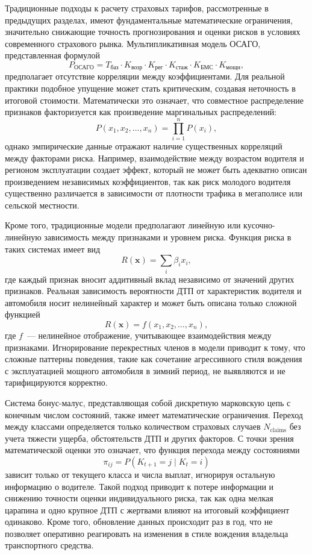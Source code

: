 Традиционные подходы к расчету страховых тарифов, рассмотренные в предыдущих разделах, имеют фундаментальные математические ограничения, значительно снижающие точность прогнозирования и оценки рисков в условиях современного страхового рынка. Мультипликативная модель ОСАГО, представленная формулой
\[
P_{\text{ОСАГО}} = T_{\text{баз}} \cdot K_{\text{возр}} \cdot K_{\text{рег}} \cdot K_{\text{стаж}} \cdot K_{\text{БМС}} \cdot K_{\text{мощн}},
\]
предполагает отсутствие корреляции между коэффициентами. Для реальной практики подобное упущение может стать критическим, создавая неточность в итоговой стоимости. Математически это означает, что совместное распределение признаков факторизуется как произведение маргинальных распределений:
\[
P(x_1, x_2, \ldots, x_n) = \prod_{i=1}^n P(x_i),
\]
однако эмпирические данные отражают наличие существенных корреляций между факторами риска. Например, взаимодействие между возрастом водителя и регионом эксплуатации создает эффект, который не может быть адекватно описан произведением независимых коэффициентов, так как риск молодого водителя существенно различается в зависимости от плотности трафика в мегаполисе или сельской местности.

Кроме того, традиционные модели предполагают линейную или кусочно-линейную зависимость между признаками и уровнем риска. Функция риска в таких системах имеет вид
\[
R(\mathbf{x}) = \sum_{i} \beta_i x_i,
\]
где каждый признак вносит аддитивный вклад независимо от значений других признаков. Реальная зависимость вероятности ДТП от характеристик водителя и автомобиля носит нелинейный характер и может быть описана только сложной функцией
\[
R(\mathbf{x}) = f(x_1, x_2, \ldots, x_n),
\]
где $f$~--- нелинейное отображение, учитывающее взаимодействия между признаками. Игнорирование перекрестных членов в модели приводит к тому, что сложные паттерны поведения, такие как сочетание агрессивного стиля вождения с эксплуатацией мощного автомобиля в зимний период, не выявляются и не тарифицируются корректно.

Система бонус-малус, представляющая собой дискретную марковскую цепь с конечным числом состояний, также имеет математические ограничения. Переход между классами определяется только количеством страховых случаев $N_{\text{claims}}$ без учета тяжести ущерба, обстоятельств ДТП и других факторов. С точки зрения математической оценки это означает, что функция перехода между состояниями
\[
\pi_{ij} = P(K_{t+1} = j \mid K_t = i)
\]
зависит только от текущего класса и числа выплат, игнорируя остальную информацию о водителе. Такой подход приводит к потере информации и снижению точности оценки индивидуального риска, так как одна мелкая царапина и одно крупное ДТП с жертвами влияют на итоговый коэффициент одинаково. Кроме того, обновление данных происходит раз в год, что не позволяет оперативно реагировать на изменения в стиле вождения владельца транспортного средства.

